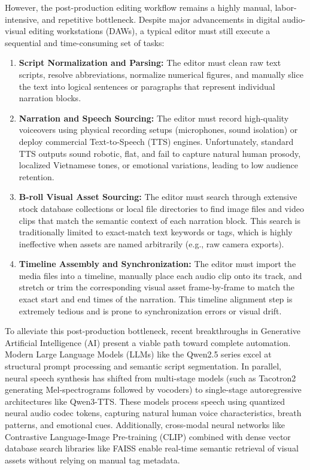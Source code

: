 \documentclass[a4paper,12pt]{report}
\begin{document}
However, the post-production editing workflow remains a highly manual, labor-intensive, and repetitive bottleneck. Despite major advancements in digital audio-visual editing workstations (DAWs), a typical editor must still execute a sequential and time-consuming set of tasks:
\begin{enumerate}
    \item \textbf{Script Normalization and Parsing:} The editor must clean raw text scripts, resolve abbreviations, normalize numerical figures, and manually slice the text into logical sentences or paragraphs that represent individual narration blocks.
    \item \textbf{Narration and Speech Sourcing:} The editor must record high-quality voiceovers using physical recording setups (microphones, sound isolation) or deploy commercial Text-to-Speech (TTS) engines. Unfortunately, standard TTS outputs sound robotic, flat, and fail to capture natural human prosody, localized Vietnamese tones, or emotional variations, leading to low audience retention.
    \item \textbf{B-roll Visual Asset Sourcing:} The editor must search through extensive stock database collections or local file directories to find image files and video clips that match the semantic context of each narration block. This search is traditionally limited to exact-match text keywords or tags, which is highly ineffective when assets are named arbitrarily (e.g., raw camera exports).
    \item \textbf{Timeline Assembly and Synchronization:} The editor must import the media files into a timeline, manually place each audio clip onto its track, and stretch or trim the corresponding visual asset frame-by-frame to match the exact start and end times of the narration. This timeline alignment step is extremely tedious and is prone to synchronization errors or visual drift.
\end{enumerate}

To alleviate this post-production bottleneck, recent breakthroughs in Generative Artificial Intelligence (AI) present a viable path toward complete automation. Modern Large Language Models (LLMs) like the Qwen2.5 series excel at structural prompt processing and semantic script segmentation. In parallel, neural speech synthesis has shifted from multi-stage models (such as Tacotron2 generating Mel-spectrograms followed by vocoders) to single-stage autoregressive architectures like Qwen3-TTS. These models process speech using quantized neural audio codec tokens, capturing natural human voice characteristics, breath patterns, and emotional cues. Additionally, cross-modal neural networks like Contrastive Language-Image Pre-training (CLIP) combined with dense vector database search libraries like FAISS enable real-time semantic retrieval of visual assets without relying on manual tag metadata.
\end{document}
